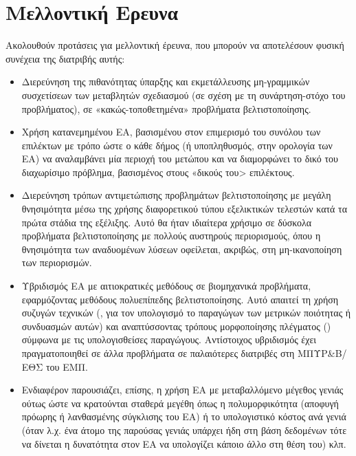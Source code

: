\section{Μελλοντική Ερευνα}
Ακολουθούν προτάσεις για μελλοντική έρευνα, που μπορούν να αποτελέσουν φυσική συνέχεια της διατριβής αυτής: 
\begin{itemize}

\item{}Διερεύνηση της πιθανότητας ύπαρξης και εκμετάλλευσης μη-γραμμικών συσχετίσεων των μεταβλητών σχεδιασμού (σε σχέση με τη συνάρτηση-στόχο του προβλήματος), σε «κακώς-τοποθετημένα» προβλήματα βελτιστοποίησης.

\item{}Χρήση κατανεμημένου ΕΑ, βασισμένου στον επιμερισμό του συνόλου των επιλέκτων με τρόπο ώστε ο κάθε δήμος (ή υποπληθυσμός, στην ορολογία των ΕΑ) να αναλαμβάνει μία περιοχή του μετώπου  και να διαμορφώνει το δικό του διαχωρίσιμο πρόβλημα, βασισμένος στους «δικούς του> επιλέκτους.

\item{}Διερεύνηση τρόπων αντιμετώπισης προβλημάτων βελτιστοποίησης με μεγάλη θνησιμότητα μέσω της χρήσης διαφορετικού τύπου εξελικτικών τελεστών κατά τα πρώτα στάδια της εξέλιξης. Αυτό θα ήταν ιδιαίτερα χρήσιμο σε δύσκολα προβλήματα βελτιστοποίησης με πολλούς αυστηρούς περιορισμούς, όπου η θνησιμότητα των αναδυομένων λύσεων οφείλεται, ακριβώς, στη μη-ικανοποίηση των περιορισμών. 	

\item{}Υβριδισμός ΕΑ με αιτιοκρατικές μεθόδους σε βιομηχανικά προβλήματα, εφαρμόζοντας μεθόδους πολυεπίπεδης βελτιστοποίησης. Αυτό απαιτεί τη χρήση συζυγών τεχνικών (, για τον υπολογισμό το παραγώγων των μετρικών ποιότητας ή συνδυασμών αυτών) και αναπτύσσοντας τρόπους μορφοποίησης πλέγματος () σύμφωνα με τις υπολογισθείσες παραγώγους. Αντίστοιχος υβριδισμός έχει πραγματοποιηθεί σε άλλα προβλήματα σε παλαιότερες διατριβές στη ΜΠΥΡ\&Β/ΕΘΣ του ΕΜΠ.%


\item{} Ενδιαφέρον  παρουσιάζει, επίσης, η χρήση ΕΑ με μεταβαλλόμενο μέγεθος γενιάς ούτως ώστε να κρατούνται σταθερά μεγέθη όπως η πολυμορφικότητα (αποφυγή πρόωρης ή λανθασμένης σύγκλισης του ΕΑ) ή το υπολογιστικό κόστος ανά γενιά (όταν λ.χ. ένα άτομο της παρούσας γενιάς υπάρχει ήδη στη βάση δεδομένων τότε να δίνεται η δυνατότητα στον ΕΑ να υπολογίζει κάποιο άλλο στη θέση του) κλπ.       


\end{itemize}



